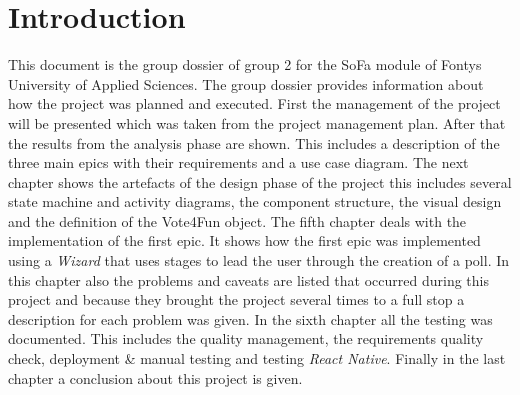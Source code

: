 \section{Introduction}
\label{sec:introduction}
This document is the group dossier of group 2 for the SoFa module of Fontys University of Applied Sciences. The group dossier provides information about how the project was planned and executed. 
\newline
First the management of the project will be presented which was taken from the project management plan. 
\newline
After that the results from the analysis phase are shown. This includes a description of the three main epics with their requirements and a use case diagram. 
\newline
The next chapter shows the artefacts of the design phase of the project this includes several state machine and activity diagrams, the component structure, the visual design and the definition of the Vote4Fun object. 
\newline
The fifth chapter deals with the implementation of the first epic. It shows how the first epic was implemented using a \textit{Wizard} that uses stages to lead the user through the creation of a poll. In this chapter also the problems and caveats are listed that occurred during this project and because they brought the project several times to a full stop a description for each problem was given.  
\newline
In the sixth chapter all the testing was documented. This includes the quality management, the requirements quality check, deployment \& manual testing and testing \textit{React Native}. 
\newline
Finally in the last chapter a conclusion about this project is given. 